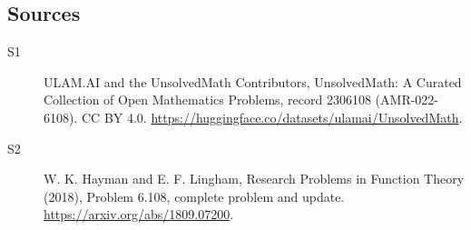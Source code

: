 \documentclass[11pt]{article}
\begin{document}
\subsection{Sources}
\begin{description}
\item[\hypertarget{source:2306108:1}{S1}] ULAM.AI and the UnsolvedMath Contributors, UnsolvedMath: A Curated Collection of Open Mathematics Problems, record 2306108 (AMR-022-6108). CC BY 4.0. \url{https://huggingface.co/datasets/ulamai/UnsolvedMath}.
\item[\hypertarget{source:2306108:2}{S2}] W. K. Hayman and E. F. Lingham, Research Problems in Function Theory (2018), Problem 6.108, complete problem and update. \url{https://arxiv.org/abs/1809.07200}.
\end{description}
\label{end:2306108}
\end{document}

